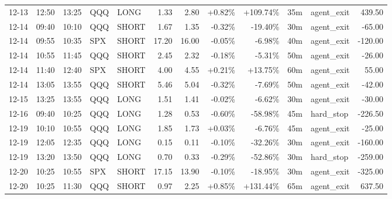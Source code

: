 \documentclass[11pt,a4paper,twoside]{article}
\begin{document}
\begin{center}
\begin{longtable}{>{\color{txtmain}}l l l l l r r r r r >{\color{txtmain}}l r}
12-13 & 12:50 & 13:25 & QQQ & LONG & 1.33 & 2.80 & \textcolor{wingreen}{+0.82\%} & \textcolor{wingreen}{+109.74\%} & 35m & agent\_exit & \textcolor{wingreen}{439.50} \\
12-14 & 09:40 & 10:10 & QQQ & SHORT & 1.67 & 1.35 & \textcolor{lossred}{-0.32\%} & \textcolor{lossred}{-19.40\%} & 30m & agent\_exit & \textcolor{lossred}{-65.00} \\
12-14 & 09:55 & 10:35 & SPX & SHORT & 17.20 & 16.00 & \textcolor{lossred}{-0.05\%} & \textcolor{lossred}{-6.98\%} & 40m & agent\_exit & \textcolor{lossred}{-120.00} \\
12-14 & 10:55 & 11:45 & QQQ & SHORT & 2.45 & 2.32 & \textcolor{lossred}{-0.18\%} & \textcolor{lossred}{-5.31\%} & 50m & agent\_exit & \textcolor{lossred}{-26.00} \\
12-14 & 11:40 & 12:40 & SPX & SHORT & 4.00 & 4.55 & \textcolor{wingreen}{+0.21\%} & \textcolor{wingreen}{+13.75\%} & 60m & agent\_exit & \textcolor{wingreen}{55.00} \\
12-14 & 13:05 & 13:55 & QQQ & SHORT & 5.46 & 5.04 & \textcolor{lossred}{-0.32\%} & \textcolor{lossred}{-7.69\%} & 50m & agent\_exit & \textcolor{lossred}{-42.00} \\
12-15 & 13:25 & 13:55 & QQQ & LONG & 1.51 & 1.41 & \textcolor{lossred}{-0.02\%} & \textcolor{lossred}{-6.62\%} & 30m & agent\_exit & \textcolor{lossred}{-30.00} \\
12-16 & 09:40 & 10:25 & QQQ & LONG & 1.28 & 0.53 & \textcolor{lossred}{-0.60\%} & \textcolor{lossred}{-58.98\%} & 45m & hard\_stop & \textcolor{lossred}{-226.50} \\
12-19 & 10:10 & 10:55 & QQQ & LONG & 1.85 & 1.73 & \textcolor{wingreen}{+0.03\%} & \textcolor{lossred}{-6.76\%} & 45m & agent\_exit & \textcolor{lossred}{-25.00} \\
12-19 & 12:05 & 12:35 & QQQ & LONG & 0.15 & 0.11 & \textcolor{lossred}{-0.10\%} & \textcolor{lossred}{-32.26\%} & 30m & agent\_exit & \textcolor{lossred}{-160.00} \\
12-19 & 13:20 & 13:50 & QQQ & LONG & 0.70 & 0.33 & \textcolor{lossred}{-0.29\%} & \textcolor{lossred}{-52.86\%} & 30m & hard\_stop & \textcolor{lossred}{-259.00} \\
12-20 & 10:25 & 10:55 & SPX & SHORT & 17.15 & 13.90 & \textcolor{lossred}{-0.10\%} & \textcolor{lossred}{-18.95\%} & 30m & agent\_exit & \textcolor{lossred}{-325.00} \\
12-20 & 10:25 & 11:30 & QQQ & SHORT & 0.97 & 2.25 & \textcolor{wingreen}{+0.85\%} & \textcolor{wingreen}{+131.44\%} & 65m & agent\_exit & \textcolor{wingreen}{637.50} \\

\end{longtable}
\end{center}
\end{document}
